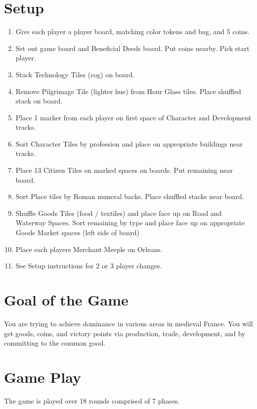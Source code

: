 \documentclass[8pt]{article}
\newenvironment{enumerateCustom}
{\begin{enumerate}
  \setlength{\itemsep}{1pt}
  \setlength{\parskip}{0pt}
  \setlength{\parsep}{0pt}}
{\end{enumerate}}
\begin{document}
\begin{multicols*}{2}

\section*{Setup}
    \begin{enumerateCustom}
        \item Give each player a player board, matching color tokens and bag, and 5 coins.
        \item Set out game board and Beneficial Deeds board. Put coins nearby. Pick start player.
        \item Stack Technology Tiles (cog) on board.
        \item Remove Pilgrimage Tile (lighter hue) from Hour Glass tiles. Place shuffled stack on board.
        \item Place 1 marker from each player on first space of Character and Development tracks.
        \item Sort Character Tiles by profession and place on appropriate buildings near tracks.
        \item Place 13 Citizen Tiles on marked spaces on boards. Put remaining near board.
        \item Sort Place tiles by Roman numeral backs. Place shuffled stacks near board.
        \item Shuffle Goods Tiles (food / textiles) and place face up on Road and Waterway Spaces. Sort remaining by type and place face up on appropriate Goods Market spaces (left side of board)
        \item Place each players Merchant Meeple on Orleans.
        \item See Setup instructions for 2 or 3 player changes.
    \end{enumerateCustom}

\section*{Goal of the Game}
You are trying to achieve dominance in various areas in medieval France. You will get goods, coins, and victory points via production, trade, development, and by committing to the common good.

\section*{Game Play}
The game is played over 18 rounds comprised of 7 phases.


\end{multicols*}
\end{document}

